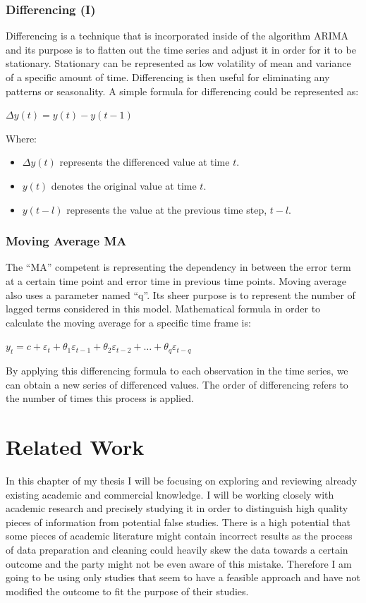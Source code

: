 \documentclass{imc-inf}
\begin{document}
		\subsection{Differencing (I)}
			Differencing is a technique that is incorporated inside of the algorithm ARIMA and its purpose is to flatten out the time series and
			 adjust it in order for it to be stationary. Stationary can be represented as low volatility of mean and variance of a specific amount of time.
			  Differencing is then useful for eliminating any patterns or seasonality. A simple formula for differencing could be represented as: 

			$\Delta y(t) = y(t) - y(t-1)$

		Where:
		\begin{itemize}
			\item $\Delta y(t)$ represents the differenced value at time $t$.
			\item $y(t)$ denotes the original value at time $t$.
			\item $y(t-l)$ represents the value at the previous time step, $t-l$.
		\end{itemize}

		\subsection{Moving Average {MA}}
			The “MA” competent is representing the dependency in between the error term at a certain time point and error time in previous time points.
			 Moving average also uses a parameter named “q”. Its sheer purpose is to represent the number of lagged terms considered in this model.
			  Mathematical formula in order to calculate the moving average for a specific time frame is:

			$y_t = c + \varepsilon_t + \theta_1 \varepsilon_{t-1} + \theta_2 \varepsilon_{t-2} + \ldots + \theta_q \varepsilon_{t-q}$

			By applying this differencing formula to each observation in the time series, we can obtain a new series of differenced values.
			 The order of differencing refers to the number of times this process is applied. 



\chapter{Related Work}\label{chap:related_work}
	In this chapter of my thesis I will be focusing on exploring and reviewing already existing academic and commercial knowledge. 
	I will be working closely with academic research and precisely studying it in order to distinguish high quality pieces of information 
	from potential false studies. There is a high potential that some pieces of academic literature might contain incorrect results as the process
	 of data preparation and cleaning could heavily skew the data towards a certain outcome and the party might not be even aware of this mistake.
	  Therefore I am going to be using only studies that seem to have a feasible approach and have not modified the outcome to fit the purpose
	   of their studies.
\end{document}
